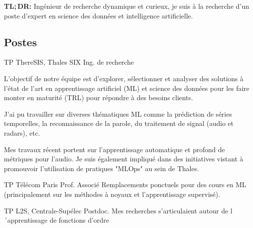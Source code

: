 \documentclass[10pt]{article} %
\begin{document}
\vspace{-1.75cm}
\begin{center}
    \textbf{TL;\,DR:} Ingénieur de recherche dynamique et curieux, je suis à la
    recherche d'un poste d'expert en science des données et intelligence
    artificielle.
\end{center}
\vspace{-3.5mm}
\begin{paracol}{2}
%
%
\section{Postes}
%
%
%
%
%
{TP} %
{ThereSIS, Thales SIX} %
{Ing. de recherche} %
{L'objectif de notre équipe est d'explorer, sélectionner et analyser des
  solutions à l'état de l'art en apprentissage artificiel (ML) et science des
  données pour les faire monter en maturité (TRL) pour répondre à
  des besoins clients. \par
  J'ai pu travailler sur diverses thématiques ML comme la prédiction de séries
  temporelles, la reconnaissance de la parole, du traitement de
  signal (audio et radars), etc. \par
  Mes travaux récent portent sur l'apprentissage automatique et profond de
  métriques pour l'audio. Je suis également impliqué dans des initiatives vistant
  à promouvoir l'utilisation de pratiques "MLOps" au sein de Thales.}\par %
{TP} %
{T\'el\'ecom Paris} %
{Prof. Associé} %
{Remplacements ponctuels pour des cours en ML (principalement sur les méthodes
à noyaux et l'apprentissage supervisé).}\par
{} %
{TP} %
{L2S, Centrale-Sup\'elec} %
{Postdoc.} %
{Mes recherches s'articulaient autour de l´apprentissage de fonctions d'ordre
}
\end{paracol}
\end{document}
